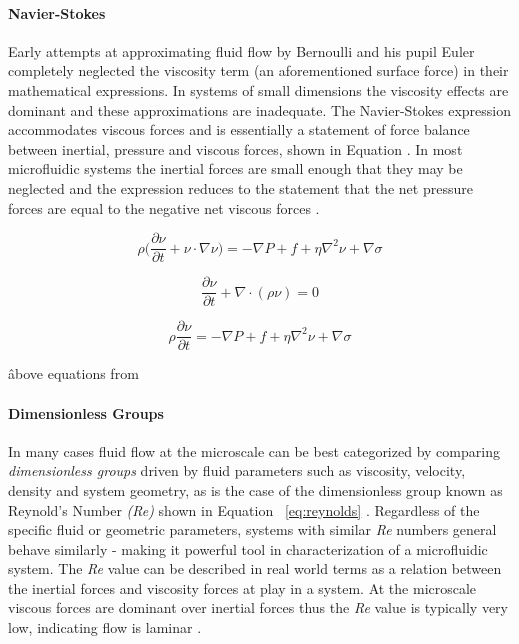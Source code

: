 \paragraph{Navier-Stokes} Early attempts at approximating fluid flow by Bernoulli and his pupil Euler completely neglected the viscosity term (an aforementioned surface force) in their mathematical expressions. In systems of small dimensions the viscosity effects are dominant and these approximations are inadequate. The Navier-Stokes expression accommodates viscous forces and is essentially a statement of force balance between inertial, pressure and viscous forces, shown in Equation . In most microfluidic systems the inertial forces are small enough that they may be neglected and the expression reduces to the statement that the net pressure forces are equal to the negative net viscous forces \cite{Vyawahare2014}.

\begin{equation}
\rho \Bigg(\frac {\partial \nu}{\partial t} + \nu \cdot \nabla \nu \Bigg) = - \nabla P+ f +\eta \nabla^2 \nu + \nabla \sigma
\label{eq:navierStokes}
\end{equation}

\begin{equation}
\frac {\partial \nu}{\partial t} + \nabla \cdot  ( \rho \nu) = 0
\label{eq:navierCOM}
\end{equation}

\begin{equation}
\rho \frac {\partial \nu}{\partial t} = - \nabla P+ f +\eta \nabla^2 \nu + \nabla \sigma
\label{eq:navierCOM}
\end{equation}

\^ above equations from \cite{Shui2007}

\paragraph{Dimensionless Groups} In many cases fluid flow at the microscale can be best categorized by comparing \emph{dimensionless groups} driven by fluid parameters such as viscosity, velocity, density and system geometry, as is the case of the dimensionless group known as Reynold's Number \emph{(Re)} shown in Equation ~\vref{eq:reynolds} . Regardless of the specific fluid or geometric parameters, systems with similar \emph{Re}  numbers general behave similarly - making it  powerful tool in characterization of a microfluidic system. The \emph{Re} value can be described in real world terms as a relation between the inertial forces and viscosity forces at play in a system. At the microscale viscous forces are dominant over inertial forces thus the \emph{Re} value is typically very low, indicating flow is laminar \cite{Kleinstreuer2013}.

